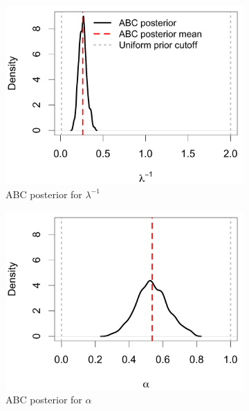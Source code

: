 \documentclass[ejs]{imsart}
\numberwithin{equation}{section}
\theoremstyle{plain}
\begin{document}
\begin{figure}[htbp]
\begin{subfigure}{0.32\textwidth}
\centering
\includegraphics[width = .95\textwidth]{figures/bate_marginal_k.pdf} 
\caption{ABC posterior for $\lambda^{-1}$}\label{subfig:bate_k}
\end{subfigure}
\begin{subfigure}{0.32\textwidth}
\centering
\includegraphics[width = .95\textwidth]{figures/bate_marginal_alpha.pdf} 
\caption{ABC posterior for $\alpha$}\label{subfig:bate_alpha}
\end{subfigure}
\begin{subfigure}{0.32\textwidth}
\centering

\end{subfigure}
\end{figure}
\end{document}
